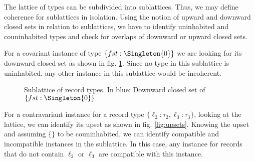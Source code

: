 The lattice of types can be subdivided into sublattices.
Thus, we may define coherence for sublattices in isolation.
Using the notion of upward and downward closed sets in relation to sublattices, we have to identify uninhabited and couninhabited types and check for overlaps of downward or upward closed sets.

For a covariant instance of type $\{ fst : \Singleton{0} \}$ we are looking for its downward closed set as shown in fig. \ref{fig:downset}.
Since no type in this sublattice is uninhabited, any other instance in this sublattice would be incoherent.

\begin{figure}[ht]
  \centering
  \caption{Sublattice of record types. In {\color{blue}blue}: Downward closed set of $\{ fst : \Singleton{0} \}$}
  \label{fig:downset}
\end{figure}


For a contravariant instance for a record type $\{ \ell_2 : \tau_2, \ell_3 : \tau_3 \}$, looking at the lattice, we can identify its upset as shown in fig. \ref{fig:upsets}.
Knowing the upset and assuming $\{\}$ to be couninhabited, we can identify compatible and incompatible instances in the sublattice.
In this case, any instance for records that do not contain $\ell_2$ or $\ell_3$ are compatible with this instance.

